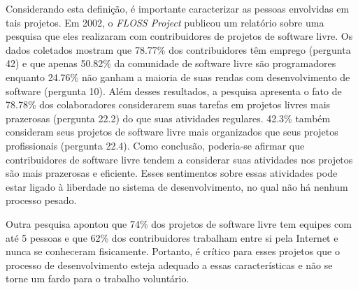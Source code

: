 Considerando esta definição, é importante caracterizar as pessoas
envolvidas em tais projetos. Em 2002, o \emph{FLOSS Project}
\cite{FlossProject} publicou um relatório sobre uma pesquisa que eles
realizaram com contribuidores de projetos de software livre. Os dados
coletados \cite{FlossStats} mostram que 78.77\% dos contribuidores têm
emprego (pergunta 42) e que apenas 50.82\% da comunidade de software
livre são programadores enquanto 24.76\% não ganham a maioria de suas
rendas com desenvolvimento de software (pergunta 10). Além desses
resultados, a pesquisa apresenta o fato de 78.78\% dos colaboradores
considerarem suas tarefas em projetos livres mais prazerosas (pergunta
22.2) do que suas atividades regulares. 42.3\% também consideram seus
projetos de software livre mais organizados que seus projetos
profissionais (pergunta 22.4). Como conclusão, poderia-se afirmar que
contribuidores de software livre tendem a considerar suas atividades
nos projetos são mais prazerosas e eficiente. Esses sentimentos sobre
essas atividades pode estar ligado à liberdade no sistema de
desenvolvimento, no qual não há nenhum processo pesado.

Outra pesquisa \cite{Reis2003} apontou que 74\% dos projetos de
software livre tem equipes com até 5 pessoas e que 62\% dos
contribuidores trabalham entre si pela Internet e nunca se conheceram
fisicamente. Portanto, é crítico para esses projetos que o processo de
desenvolvimento esteja adequado a essas características e não se torne
um fardo para o trabalho voluntário.
